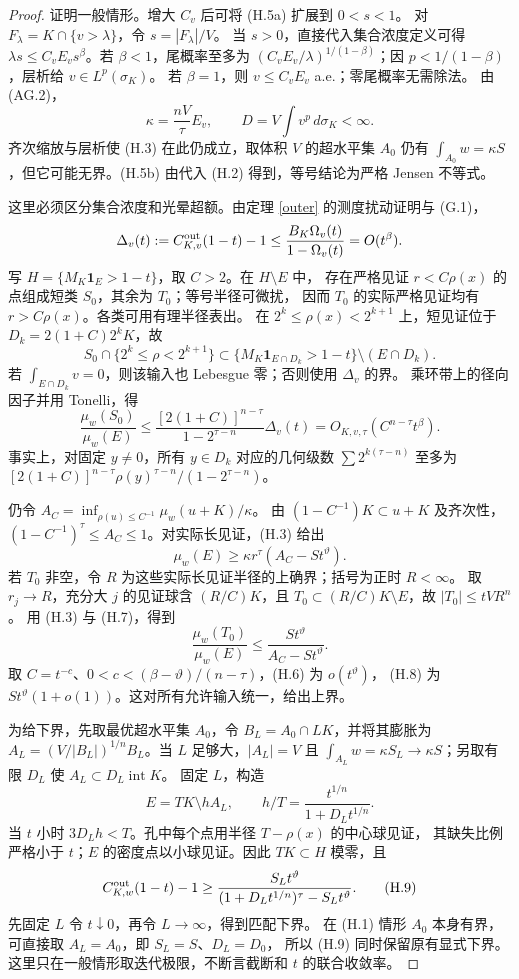 \begin{proof}
证明一般情形。增大 $C_v$ 后可将 (H.5a) 扩展到 $0<s<1$。
对 $F_\lambda=K\cap\{v>\lambda\}$，令 $s=|F_\lambda|/V$。
当 $s>0$，直接代入集合浓度定义可得
$\lambda s\le C_v E_v s^\beta$。若 $\beta<1$，尾概率至多为
$(C_vE_v/\lambda)^{1/(1-\beta)}$；因 $p<1/(1-\beta)$，层析给 $v\in L^p(\sigma_K)$。
若 $\beta=1$，则 $v\le C_vE_v$ a.e.；零尾概率无需除法。
由 (AG.2)，
\[
\kappa=\frac{nV}{\tau}E_v,\qquad D=V\int v^p\,d\sigma_K<\infty.
\]
齐次缩放与层析使 (H.3) 在此仍成立，取体积 $V$ 的超水平集 $A_0$ 仍有
$\int_{A_0}w=\kappa S$，但它可能无界。(H.5b) 由代入 (H.2) 得到，等号结论为严格 Jensen 不等式。

这里必须区分集合浓度和光晕超额。由定理 \ref{outer} 的测度扰动证明与 (G.1)，
\[
\Delta_v(t):=C^{\rm out}_{K,v}(1-t)-1
\le\frac{B_K\Omega_v(t)}{1-\Omega_v(t)}=O(t^\beta).
\]
写 $H=\{M_K\mathbf1_E>1-t\}$，取 $C>2$。在 $H\setminus E$ 中，
存在严格见证 $r<C\rho(x)$ 的点组成短类 $S_0$，其余为 $T_0$；等号半径可微扰，
因而 $T_0$ 的实际严格见证均有 $r>C\rho(x)$。各类可用有理半径表出。
在 $2^k\le\rho(x)<2^{k+1}$ 上，短见证位于 $D_k=2(1+C)2^kK$，故
\[
S_0\cap\{2^k\le\rho<2^{k+1}\}
\subset\{M_K\mathbf1_{E\cap D_k}>1-t\}\setminus(E\cap D_k).
\]
若 $\int_{E\cap D_k}v=0$，则该输入也 Lebesgue 零；否则使用 $\Delta_v$ 的界。
乘环带上的径向因子并用 Tonelli，得
\[
\frac{\mu_w(S_0)}{\mu_w(E)}
\le\frac{[2(1+C)]^{n-\tau}}{1-2^{\tau-n}}\Delta_v(t)
=O_{K,v,\tau}(C^{n-\tau}t^\beta). \tag{H.6}
\]
事实上，对固定 $y\ne0$，所有 $y\in D_k$ 对应的几何级数
$\sum 2^{k(\tau-n)}$ 至多为
$[2(1+C)]^{n-\tau}\rho(y)^{\tau-n}/(1-2^{\tau-n})$。

仍令 $A_C=\inf_{\rho(u)\le C^{-1}}\mu_w(u+K)/\kappa$。
由 $(1-C^{-1})K\subset u+K$ 及齐次性，
$(1-C^{-1})^\tau\le A_C\le1$。对实际长见证，(H.3) 给出
\[
\mu_w(E)\ge\kappa r^\tau(A_C-S t^\vartheta). \tag{H.7}
\]
若 $T_0$ 非空，令 $R$ 为这些实际长见证半径的上确界；括号为正时 $R<\infty$。
取 $r_j\to R$，充分大 $j$ 的见证球含 $(R/C)K$，且
$T_0\subset(R/C)K\setminus E$，故 $|T_0|\le tVR^n$。
用 (H.3) 与 (H.7)，得到
\[
\frac{\mu_w(T_0)}{\mu_w(E)}\le
\frac{S t^\vartheta}{A_C-S t^\vartheta}. \tag{H.8}
\]
取 $C=t^{-c}$、$0<c<(\beta-\vartheta)/(n-\tau)$，(H.6) 为 $o(t^\vartheta)$，
(H.8) 为 $S t^\vartheta(1+o(1))$。这对所有允许输入统一，给出上界。

为给下界，先取最优超水平集 $A_0$，令 $B_L=A_0\cap LK$，并将其膨胀为
$A_L=(V/|B_L|)^{1/n}B_L$。当 $L$ 足够大，$|A_L|=V$ 且
$\int_{A_L}w=\kappa S_L\to\kappa S$；另取有限 $D_L$ 使 $A_L\subset D_L\operatorname{int}K$。
固定 $L$，构造
\[
E=TK\setminus hA_L,\qquad h/T=\frac{t^{1/n}}{1+D_Lt^{1/n}}.
\]
当 $t$ 小时 $3D_Lh<T$。孔中每个点用半径 $T-\rho(x)$ 的中心球见证，
其缺失比例严格小于 $t$；$E$ 的密度点以小球见证。因此 $TK\subset H$ 模零，且
\[
C^{\rm out}_{K,w}(1-t)-1\ge
\frac{S_Lt^\vartheta}{(1+D_Lt^{1/n})^\tau-S_Lt^\vartheta}. \tag{H.9}
\]
先固定 $L$ 令 $t\downarrow0$，再令 $L\to\infty$，得到匹配下界。
在 (H.1) 情形 $A_0$ 本身有界，可直接取 $A_L=A_0$，即 $S_L=S$、$D_L=D_0$，
所以 (H.9) 同时保留原有显式下界。这里只在一般情形取迭代极限，不断言截断和 $t$ 的联合收敛率。
\end{proof}

